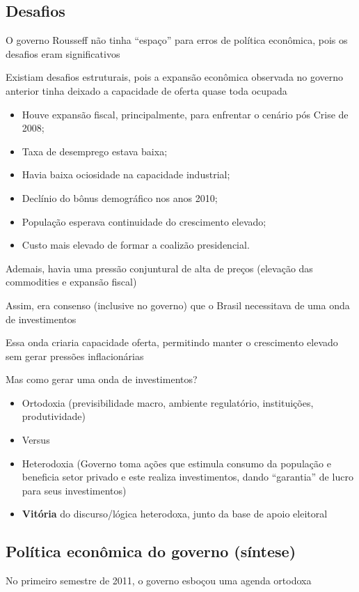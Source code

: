 \documentclass[a4paper,12pt]{article}[abntex2]
\begin{document}
\subsection{\textbf{Desafios}}
O governo Rousseff não tinha “espaço” para erros de política econômica, pois os desafios eram significativos

Existiam desafios estruturais, pois a expansão econômica observada no governo anterior tinha deixado a capacidade de oferta quase toda ocupada\begin{itemize}
    \item Houve expansão fiscal, principalmente, para enfrentar o cenário pós Crise de 2008;
    \item Taxa de desemprego estava baixa;
    \item Havia baixa ociosidade na capacidade industrial;
    \item Declínio do bônus demográfico nos anos 2010;
    \item População esperava continuidade do crescimento elevado;
    \item Custo mais elevado de formar a coalizão presidencial.
\end{itemize}

Ademais, havia uma pressão conjuntural de alta de preços (elevação das commodities e expansão fiscal)

Assim, era consenso (inclusive no governo) que o Brasil necessitava de uma onda de investimentos

Essa onda criaria capacidade oferta, permitindo manter o crescimento elevado sem gerar pressões inflacionárias

Mas como gerar uma onda de investimentos?

\begin{itemize}
    \item Ortodoxia (previsibilidade macro, ambiente regulatório, instituições, produtividade)
    \item Versus
    \item Heterodoxia (Governo toma ações que estimula consumo da população e beneficia setor privado e este realiza investimentos, dando “garantia” de lucro para seus investimentos)
    \item \textbf{Vitória} do discurso/lógica heterodoxa, junto da base de apoio eleitoral
\end{itemize}

\subsection{\textbf{Política econômica do governo (síntese)}}
No primeiro semestre de 2011, o governo esboçou uma agenda ortodoxa
\end{document}
